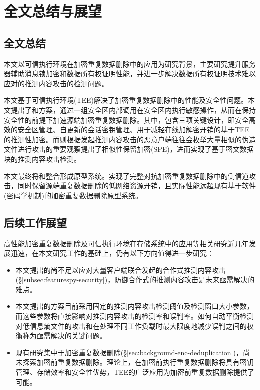 \chapter{全文总结与展望}

\section{全文总结}

本文以可信执行环境在加密重复数据删除中的应用为研究背景，主要研究提升服务器辅助消息锁加密和数据所有权证明性能，并进一步解决数据所有权证明技术难以应对的推测内容攻击的检测问题。

本文基于可信执行环境(TEE)解决了加密重复数据删除中的性能及安全性问题。本文提出了\sysnameS 和\sysnameF 方案，通过一组安全区内部调用在安全区内执行敏感操作，从而在保持安全性的前提下加速源端加密重复数据删除。其中，\sysnameS 包含三项关键设计，即安全高效的安全区管理、自更新的会话密钥管理、用于减轻在线加解密开销的基于TEE的推测性加密。而\sysnameF 则根据发起推测内容攻击的恶意户端往往会枚举大量相似的伪造文件进行攻击的重要观察提出了相似性保留加密(SPE)，进而实现了基于密文数据块的推测内容攻击检测。

本文最终将\sysnameS 和\sysnameF 整合形成\prototype 原型系统。实现了完整对抗加密重复数据删除中的侧信道攻击，同时保留源端重复数据删除的低网络资源开销，且实际性能远超现有基于软件(密码学机制)的加密重复数据删除原型系统。

\section{后续工作展望}

高性能加密重复数据删除及可信执行环境在存储系统中的应用等相关研究近几年发展迅速，在本文研究工作的基础上，仍有以下方向值得进一步研究：

\begin{itemize}[leftmargin=0em]
    \item 本文提出的\sysnameF 尚不足以应对大量客户端联合发起的合作式推测内容攻击(\S\ref{subsec:featurespy-security})，防御合作式的推测内容攻击是未来亟需解决的难点。
    \item 本文提出的\sysnameF 方案目前采用固定的推测内容攻击检测阈值及检测窗口大小参数，而这些参数将直接影响对推测内容攻击的检测率和误判率。如何自动平衡检测对低信息熵文件的攻击和在处理不同工作负载时最大限度地减少误判之间的权衡称为亟需解决的关键问题。
    \item 现有研究集中于加密重复数据删除(\S\ref{sec:background-enc-deduplication})，尚未探索加密前重复数据删除。理论上，在加密前执行重复数据删除将具有密钥管理、存储效率和安全性优势，TEE的广泛应用为加密前重复数据删除提供了可能。
\end{itemize}
